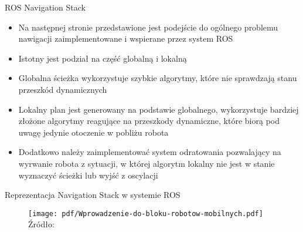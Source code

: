 \begin{frame}
{ROS Navigation Stack}
	\begin{itemize}
		\item Na następnej stronie przedstawione jest podejście do ogólnego problemu nawigacji zaimplementowane i wspierane przez system ROS
		\item Istotny jest podział na część globalną i lokalną
		\item Globalna ścieżka wykorzystuje szybkie algorytmy, które nie sprawdzają stanu przeszkód dynamicznych
		\item Lokalny plan jest generowany na podstawie globalnego, wykorzystuje bardziej złożone algorytmy reagujące na przeszkody dynamiczne, które biorą pod uwagę jedynie otoczenie w pobliżu robota
		\item Dodatkowo należy zaimplementować system odratowania pozwalający na wyrwanie robota z sytuacji, w której algorytm lokalny nie jest w stanie wyznaczyć ścieżki lub wyjść z oscylacji
	\end{itemize}
\end{frame}

\begin{frame}
{Reprezentacja Navigation Stack w systemie ROS}
	\begin{center}
		\begin{figure}
			\centering
			\texttt{[image: pdf/Wprowadzenie-do-bloku-robotow-mobilnych.pdf]}
			\hspace*{15pt}\hbox{\scriptsize{Źródło:}}
		\end{figure}
	\end{center}
\end{frame}